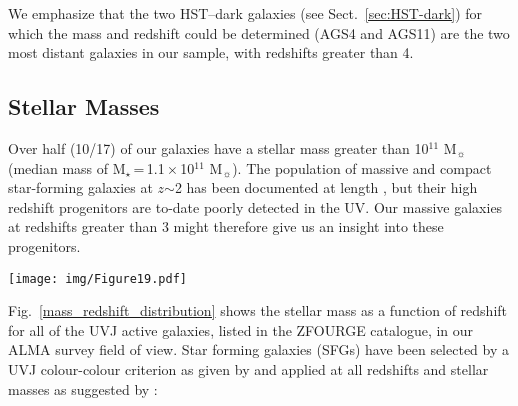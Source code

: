 \documentclass[longauth]{aa}
\begin{document}
We emphasize that the two HST--dark galaxies (see Sect.~\ref{sec:HST-dark}) for which the mass and redshift could be determined (AGS4 and AGS11) are the two most distant galaxies in our sample, with redshifts greater than 4.

\subsection{Stellar Masses}\label{sec::stellar_masses}

Over half (10/17) of our galaxies have a stellar mass greater than 10$^{11}$ M$_\sun$ (median mass of $\text{M}_{\star}$\,=\,1.1\,$\times$\,10$^{11}$ M$_\sun$).
The population of massive and compact star-forming galaxies at $z$$\sim$2 has been documented at length \citep[e.g.][]{Daddi2005,van_Dokkum2015}, but their high redshift progenitors are to-date poorly detected in the UV. Our massive galaxies at redshifts greater than 3 might therefore give us an insight into these progenitors.

   \begin{figure*}
   \centering
   \texttt{[image: img/Figure19.pdf]}
      \caption{Stellar mass versus redshift for the galaxies detected in our ALMA GOODS--\textit{South} blind survey (red points). For comparison, the distribution of all of the galaxies, listed in the ZFOURGE catalogue, in the same field of view is given in blue. Only UVJ active galaxies are shown. The two HST-dark galaxies for which we have redshifts (AGS4 and AGS11) are represented by open circles. The redshift of AGS11 is however uncertain. The green dashed line shows the position that would be occupied by a typical star-forming galaxy -- lying on the median of the SFR-M$_{\star}$ star-formation main sequence (MS) -- that would produce a 1.1mm flux density equal to our average detection limit of 0.88\,mJy (4.8-$\sigma$) using the Spectral Energy Distribution (SED) library of \cite{Schreiber2017}. The dotted line illustrates the position of galaxies 3 times above the MS using the appropriate SEDs from the same library. Galaxies hosting an AGN that are undetected or detected by ALMA are identified with black dotes and yellow stars respectively. Inside the black dashed rectangle, 50\% of the galaxies detected by ALMA host an AGN, while only 14\% of the UVJ active galaxies undetected by ALMA host an AGN.}
         \label{mass_redshift_distribution}
   \end{figure*}

Fig.~\ref{mass_redshift_distribution} shows the stellar mass as a function of redshift for all of the UVJ active galaxies, listed in the ZFOURGE catalogue, in our ALMA survey field of view. Star forming galaxies (SFGs) have been selected by a UVJ colour-colour criterion as given by \cite{Williams2009} and applied at all redshifts and stellar masses as suggested by \cite{Schreiber2015}:
\end{document}
